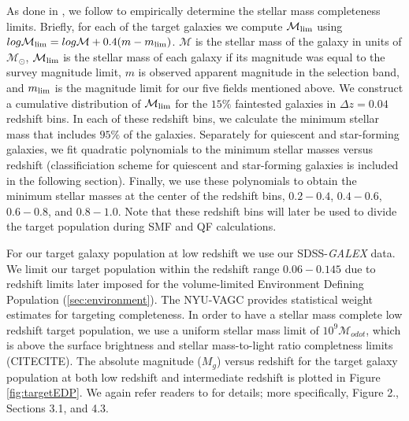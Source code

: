 \documentclass{emulateapj}
\begin{document}
As done in \cite{Moustakas:2013aa}, we follow \cite{Pozzetti:2010aa} to empirically determine the stellar mass completeness limits.
Briefly, for each of the target galaxies we compute $\mathcal{M}_{\rm{lim}}$ using $log \mathcal{M}_{\rm{lim}} = log \mathcal{M} + 0.4 ( m - m_{\rm{lim}})$.
$\mathcal{M}$ is the stellar mass of the galaxy in units of $\mathcal{M_{\odot}}$, $\mathcal{M}_{\rm{lim}}$ is the stellar mass of each galaxy if its magnitude was 
equal to the survey magnitude limit, $m$ is observed apparent magnitude in the selection band, and $m_{\rm{lim}}$ is the magnitude limit for our five fields mentioned above.
We construct a cumulative distribution of $\mathcal{M}_{\rm{lim}}$ for the $15\%$ faintested galaxies in $\Delta z=0.04$ redshift bins.
In each of these redshift bins, we calculate the minimum stellar mass that includes $95 \%$ of the galaxies.
Separately for quiescent and star-forming galaxies, we fit quadratic polynomials to the minimum stellar masses versus redshift (classificiation scheme for quiescent 
and star-forming galaxies is included in the following section).
Finally, we use these polynomials to obtain the minimum stellar masses at the center of the redshift bins, $0.2-0.4$, $0.4-0.6$, $0.6-0.8$, and $0.8-1.0$.
Note that these redshift bins will later be used to divide the target population during SMF and QF calculations.

For our target galaxy population at low redshift we use our SDSS-{\em GALEX} data. 
We limit our target population within the redshift range $0.06-0.145$ due to redshift limits later imposed for the volume-limited Environment Defining Population (\ref{sec:environment}).
The NYU-VAGC provides statistical weight estimates for targeting completeness.
In order to have a stellar mass complete low redshift target population, we use a uniform stellar mass limit of $10^9 \mathcal{M}_{odot}$, which is above the surface 
brightness and stellar mass-to-light ratio completness limits (CITECITE).
The absolute magnitude ($M_g$) versus redshift for the target galaxy population at both low redshift and intermediate redshift is plotted in Figure \ref{fig:targetEDP}.
We again refer readers to \cite{Moustakas:2013aa} for details; more specifically, Figure 2., Sections 3.1, and 4.3. 

\begin{figure*}
    \begin{center}
        \leavevmode
        \label{fig:targetEDP}
        \caption{Absolute magnitude $M_{r}$ vs. redshift for the target galaxy population (black) with the Environment Defining Population (red) plotted on top. Both samples are divided into redshift bins:$0.06-0.145$, $0.2-0.4$, $0.4-0.6$, and $0.6-0.8$. The target galaxy population is stellar mass complete (Section \ref{sec:target} while the EDP is volume limited through $M_{g}$ limits (Section \ref{sec:environment}).}
    \end{center}
\end{figure*}
\end{document}
